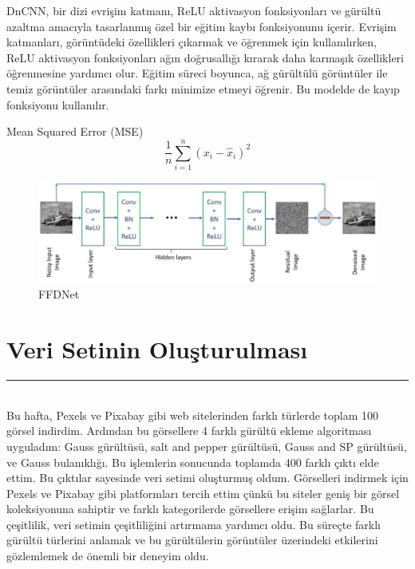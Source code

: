 \documentclass{article}
\begin{document}
\noindent DnCNN, bir dizi evrişim katmanı, ReLU aktivasyon fonksiyonları ve gürültü azaltma amacıyla tasarlanmış özel bir eğitim kaybı fonksiyonunu içerir. Evrişim katmanları, görüntüdeki özellikleri çıkarmak ve öğrenmek için kullanılırken, ReLU aktivasyon fonksiyonları ağın doğrusallığı kırarak daha karmaşık özellikleri öğrenmesine yardımcı olur. Eğitim süreci boyunca, ağ gürültülü görüntüler ile temiz görüntüler arasındaki farkı minimize etmeyi öğrenir. Bu modelde de kayıp fonksiyonu kullanılır.\vspace{1 cm}

Mean Squared Error (MSE) 
\begin{equation}
    \frac{1}{n} \sum_{i=1}^{n} (x_{i} - \hat{x}_{i})^2
\end{equation}

\renewcommand{\figurename}{Şekil}

\begin{figure}[htbp]
     \centering
\includegraphics[angle=360,width=1.1\textwidth]{dncnn.png}\centering 
  \caption{FFDNet\cite{alawode2021dense}}
  \label{fig:resim_etiketi}
\end{figure}
\newpage

\section{Veri Setinin Oluşturulması}
\rule{\textwidth}{0.5pt}\\[10pt]

 \noindent Bu hafta, Pexels\cite{Pexels} ve Pixabay\cite{Pixabay} gibi web sitelerinden farklı türlerde toplam 100 görsel indirdim. Ardından bu görsellere 4 farklı gürültü ekleme algoritması uyguladım: Gauss gürültüsü, salt and pepper gürültüsü, Gauss and SP gürültüsü, ve Gauss bulanıklığı. Bu işlemlerin sonucunda toplamda 400 farklı çıktı elde ettim. Bu çıktılar sayesinde veri setimi oluşturmuş oldum. Görselleri indirmek için Pexels ve Pixabay gibi platformları tercih ettim çünkü bu siteler geniş bir görsel koleksiyonuna sahiptir ve farklı kategorilerde görsellere erişim sağlarlar. Bu çeşitlilik, veri setimin çeşitliliğini artırmama yardımcı oldu. Bu süreçte farklı gürültü türlerini anlamak ve bu gürültülerin görüntüler üzerindeki etkilerini gözlemlemek de önemli bir deneyim oldu.\vspace{0,5cm}
\end{document}
